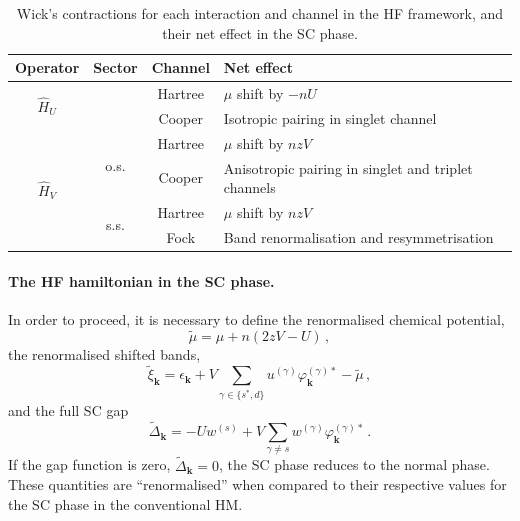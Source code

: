 \begin{table}[t]
	\centering
	\begin{tabular}{c c c l}
		\textbf{Operator} & \textbf{Sector} & \textbf{Channel} & \textbf{Net effect} \\
		\midrule
		\multirow{2}{*}{$\hat H_U$} && Hartree & $\mu$ shift by $-nU$ \\
		&& Cooper & Isotropic pairing in singlet channel \\
		\midrule
		\multirow{4}{*}{$\hat H_V$} & \multirow{2}{*}{o.s.} & Hartree & $\mu$ shift by $nzV$ \\
		&& Cooper & Anisotropic pairing in singlet and triplet channels \\[0.5em]
		& \multirow{2}{*}{s.s.} & Hartree & $\mu$ shift by $nzV$ \\
		&& Fock & Band renormalisation and resymmetrisation \\
		\midrule
	\end{tabular}
	\caption{Wick's contractions for each interaction and channel in the HF framework, and their net effect in the SC phase.}
	\label{tab:sc-RWCs}
\end{table}

\paragraph{The HF hamiltonian in the SC phase.}

In order to proceed, it is necessary to define the renormalised chemical potential,
\begin{equation}\label{eq:sc-mu-shift}
	\tilde{\mu} = \mu + n(2zV-U) \, ,
\end{equation}
the renormalised shifted bands,
\begin{equation}\label{eq:sc-ehm-full-bands}
	\tilde{\xi}_\mathbf{k} = \epsilon_\mathbf{k} + V \sum_{\gamma\in\lbrace s^*,d \rbrace} u^{(\gamma)} \varphi_{\mathbf{k}}^{(\gamma)*} - \tilde{\mu} \, ,
\end{equation}
and the full SC gap
\begin{equation}\label{eq:sc-ehm-full-gap}
	\tilde{\Delta}_\mathbf{k} = -Uw^{(s)} + V \sum_{\gamma\neq s} w^{(\gamma)} \varphi_\mathbf{k}^{(\gamma)*} \, .
\end{equation}
If the gap function is zero, $\tilde{\Delta}_\mathbf{k}=0$, the SC phase reduces to the normal phase. These quantities are ``renormalised'' when compared to their respective values for the SC phase in the conventional HM.

